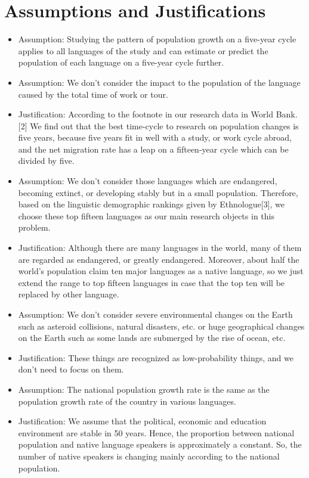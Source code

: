 \documentclass{mcmthesis}
\begin{document}
\section{Assumptions and Justifications}
\begin{itemize}
\item Assumption: Studying the pattern of population growth on a five-year cycle applies to all languages of the study and can estimate or predict the population of each language on a five-year cycle further.
\item Assumption: We don't consider the impact to the population of the language caused by the total time of work or tour.
\item Justification: According to the footnote in our research data in World Bank. [2] We find out that the best time-cycle to research on population changes is five years, because five years fit in well with a study, or work cycle abroad, and the net migration rate has a leap on a fifteen-year cycle which can be divided by five.
\item Assumption: We don't consider those languages which are endangered, becoming extinct, or developing stably but in a small population. Therefore, based on the linguistic demographic rankings given by Ethnologue[3], we choose these top fifteen languages as our main research objects in this problem.
\item Justification: Although there are many languages in the world, many of them are regarded as endangered, or greatly endangered. Moreover, about half the world's population claim ten major languages as a native language, so we just extend the range to top fifteen languages in case that the top ten will be replaced by other language.
\item Assumption: We don't consider severe environmental changes on the Earth such as asteroid collisions, natural disasters, etc. or huge geographical changes on the Earth such as some lands are submerged by the rise of ocean, etc.
\item Justification: These things are recognized as low-probability things, and we don't need to focus on them.
\item Assumption: The national population growth rate is the same as the population growth rate of the country in various languages.
\item Justification: We assume that the political, economic and education environment are stable in 50 years. Hence, the proportion between national population and native language speakers is approximately a constant. So, the number of native speakers is changing mainly according to the national population.

\end{itemize}
\end{document}
